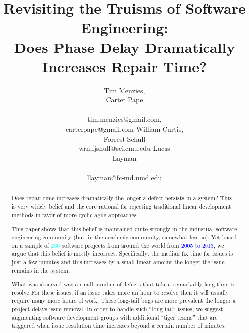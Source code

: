 \documentclass{sig-alternate}
\newcommand{\bill}[1]{\textcolor{blue}{#1}}
\newcommand{\carter}[1]{\textcolor{cyan}{#1}}
\begin{document}
\title{Revisiting the Truisms of Software Engineering:\\ Does Phase Delay Dramatically Increases  Repair Time?}
\author{
\alignauthor
Tim Menzies, \\Carter Pape\\
       \\
       tim.menzies@gmail.com,\\carterpape@gmail.com
\alignauthor
William Curtis,\\ Forrest Schull\\
wrn,fjshull@sei.cmu.edu
\alignauthor
Lucas \\Layman\\
       \\ 
       llayman@fc-md.umd.edu
} 


 
\maketitle
\begin{abstract}
Does
repair time increases dramatically
the longer a defect persists in a system?
This  is very widely belief and the core rational  for
 rejecting   traditional linear development methods
 in favor of more cyclic agile approaches.

This paper shows that this belief is maintained
quite strongly in the industrial software engineering
community (but, in the academic community, somewhat less so).
Yet based on a sample of 
\carter{230} software projects from around the world from 
\bill{2005 to 2013}, we argue that this belief is mostly 
incorrect. Specifically: the median fix time for issues
is just a few minutes and this increases by a small linear amount
the longer the issue remains in the system. 

What was observed was a small number
of defects that take a remarkably long time to resolve
For these issues, if an issue takes more an hour
to resolve then it will usually require many more hours of work.
These long-tail bugs
are more prevalent the longer a project delays issue removal. 
In order to handle such ``long tail'' issues,
we suggest  augmenting software
development groups with additional ``tiger teams'' that are triggered
when issue resolution time increases beyond a certain number of
minutes.
\end{abstract}
\end{document}
